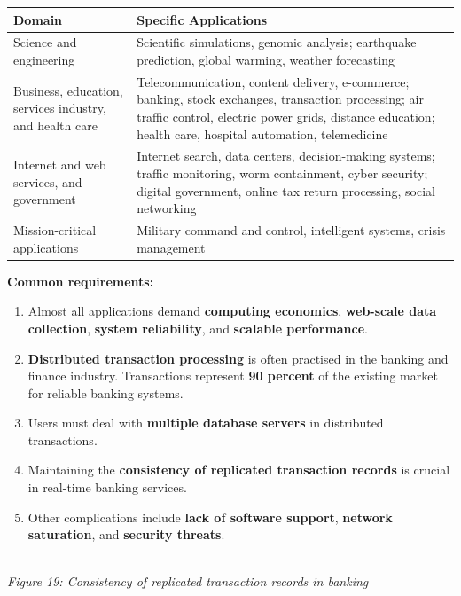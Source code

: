 \documentclass[11pt,a4paper]{article}
\newcommand{\figcap}[1]{\\[2pt]{\footnotesize\textit{#1}}}
\begin{document}
\begin{center}
\renewcommand{\arraystretch}{1.25}
\small
\begin{tabular}{|p{4cm}|p{11cm}|}
\hline
\textbf{Domain} & \textbf{Specific Applications} \\ \hline
Science and engineering & Scientific simulations, genomic analysis; earthquake prediction, global warming, weather forecasting \\ \hline
Business, education, services industry, and health care & Telecommunication, content delivery, e-commerce; banking, stock exchanges, transaction processing; air traffic control, electric power grids, distance education; health care, hospital automation, telemedicine \\ \hline
Internet and web services, and government & Internet search, data centers, decision-making systems; traffic monitoring, worm containment, cyber security; digital government, online tax return processing, social networking \\ \hline
Mission-critical applications & Military command and control, intelligent systems, crisis management \\ \hline
\end{tabular}
\end{center}

\textbf{Common requirements:}
\begin{enumerate}
\item Almost all applications demand \textbf{computing economics}, \textbf{web-scale data collection}, \textbf{system reliability}, and \textbf{scalable performance}.
\item \textbf{Distributed transaction processing} is often practised in the banking and finance industry. Transactions represent \textbf{90 percent} of the existing market for reliable banking systems.
\item Users must deal with \textbf{multiple database servers} in distributed transactions.
\item Maintaining the \textbf{consistency of replicated transaction records} is crucial in real-time banking services.
\item Other complications include \textbf{lack of software support}, \textbf{network saturation}, and \textbf{security threats}.
\end{enumerate}

\begin{center}
\figcap{Figure 19: Consistency of replicated transaction records in banking}
\end{center}
\end{document}
